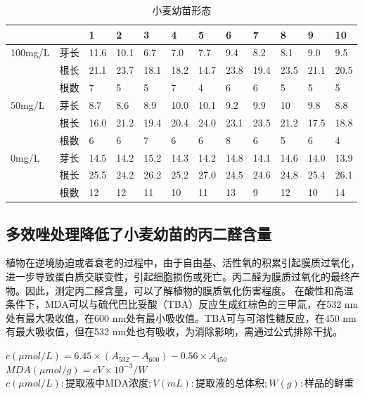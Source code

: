 \documentclass[UTF8]{ctexart}
\begin{document}
    \begin{table}[!h]
        \centering
        \setlength{\abovecaptionskip}{0.cm}
        \caption{小麦幼苗形态}
        \begin{tabular}{llllllllllll}
        \hline
                &    & 1    & 2    & 3    & 4    & 5    & 6    & 7    & 8    & 9    & 10   \\ \hline
        100mg/L & 芽长 & 11.6 & 10.1 & 6.7  & 7.0  & 7.7  & 9.4  & 8.2  & 8.1  & 9.0  & 9.5  \\
                & 根长 & 21.1 & 23.7 & 18.1 & 18.2 & 14.7 & 23.8 & 19.4 & 23.5 & 21.1 & 20.5 \\
                & 根数 & 7    & 5    & 5    & 7    & 4    & 6    & 6    & 5    & 5    & 5    \\ \hline
        50mg/L  & 芽长 & 8.7  & 8.6  & 8.9  & 10.0 & 10.1 & 9.2  & 9.9  & 10   & 9.8  & 8.8  \\
                & 根长 & 16.0 & 21.2 & 19.4 & 20.4 & 24.0 & 23.1 & 23.5 & 21.2 & 17.5 & 18.8 \\
                & 根数 & 6    & 6    & 7    & 6    & 6    & 8    & 6    & 5    & 6    & 4    \\ \hline
        0mg/L   & 芽长 & 14.5 & 14.2 & 15.2 & 14.3 & 14.2 & 14.8 & 14.1 & 14.6 & 14.0 & 13.9 \\
                & 根长 & 25.5 & 24.2 & 26.2 & 25.2 & 27.0 & 24.5 & 24.6 & 24.8 & 25.4 & 26.1 \\
                & 根数 & 12   & 12   & 11   & 10   & 11   & 13   & 9    & 12   & 10   & 14   \\ \hline
        \end{tabular}%
    \end{table}

    

    \subsection{多效唑处理降低了小麦幼苗的丙二醛含量}
    植物在逆境胁迫或者衰老的过程中，由于自由基、活性氧的积累引起膜质过氧化，进一步导致蛋白质交联变性，引起细胞损伤或死亡。丙二醛为膜质过氧化的最终产物。因此，测定丙二醛含量，可以了解植物的膜质氧化伤害程度。
    在酸性和高温条件下，MDA可以与硫代巴比妥酸（TBA）反应生成红棕色的三甲氚，在532 nm处有最大吸收值，在600 nm处有最小吸收值。TBA可与可溶性糖反应，在450 nm有最大吸收值，但在532 nm处也有吸收，为消除影响，需通过公式排除干扰。
    \begin{center}
        $c(\mu mol/L) = 6.45 \times (A_{532} - A_{600}) - 0.56 \times A_{450} $
        \\ $MDA(\mu mol/g) = cV \times 10^{-3}/W$
        \\ $c(\mu mol/L): \mbox{提取液中MDA浓度}; V(mL):\mbox{提取液的总体积}; W(g):\mbox{样品的鲜重}$
    \end{center}
    
\end{document}
